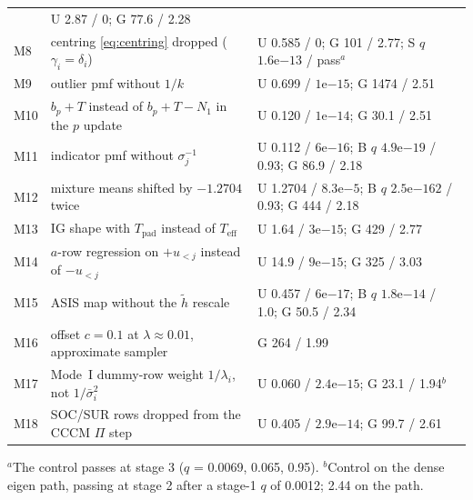 \begin{table}[tbp]
\begin{tabular}{@{}l p{} p{}@{}}
       & U 2.87 / 0; G 77.6 / 2.28 \\
    M8 & centring \eqref{eq:centring} dropped ($\gamma_i = \delta_i$)
       & U 0.585 / 0; G 101 / 2.77; S $q$ $1.6\mathrm{e}{-13}$ / pass$^{a}$ \\
    M9 & outlier pmf without $1/k$
       & U 0.699 / $1\mathrm{e}{-15}$; G 1474 / 2.51 \\
    M10 & $b_p + T$ instead of $b_p + T - N_1$ in the $p$ update
       & U 0.120 / $1\mathrm{e}{-14}$; G 30.1 / 2.51 \\
    M11 & indicator pmf without $\sigma_j^{-1}$
       & U 0.112 / $6\mathrm{e}{-16}$; B $q$ $4.9\mathrm{e}{-19}$ / 0.93; G 86.9 / 2.18 \\
    M12 & mixture means shifted by $-1.2704$ twice
       & U 1.2704 / $8.3\mathrm{e}{-5}$; B $q$ $2.5\mathrm{e}{-162}$ / 0.93; G 444 / 2.18 \\
    M13 & IG shape with $T_{\mathrm{pad}}$ instead of $T_{\mathrm{eff}}$
       & U 1.64 / $3\mathrm{e}{-15}$; G 429 / 2.77 \\
    M14 & $a$-row regression on $+u_{<j}$ instead of $-u_{<j}$
       & U 14.9 / $9\mathrm{e}{-15}$; G 325 / 3.03 \\
    M15 & ASIS map without the $\tilde h$ rescale
       & U 0.457 / $6\mathrm{e}{-17}$; B $q$ $1.8\mathrm{e}{-14}$ / 1.0; G 50.5 / 2.34 \\
    M16 & offset $c = 0.1$ at $\lambda \approx 0.01$, approximate sampler
       & G 264 / 1.99 \\
    M17 & Mode~I dummy-row weight $1/\lambda_i$, not $1/\bar\sigma_i^2$
       & U 0.060 / $2.4\mathrm{e}{-15}$; G 23.1 / 1.94$^{b}$ \\
    M18 & SOC/SUR rows dropped from the CCCM $\Pi$ step
       & U 0.405 / $2.9\mathrm{e}{-14}$; G 99.7 / 2.61 \\
    \bottomrule
  \end{tabular}

  \smallskip
  \raggedright
  $^{a}$The control passes at stage 3 ($q$ = 0.0069, 0.065, 0.95).
  $^{b}$Control on the dense eigen path, passing at stage 2 after a stage-1 $q$ of 0.0012;
  2.44 on the  path.
\end{table}

